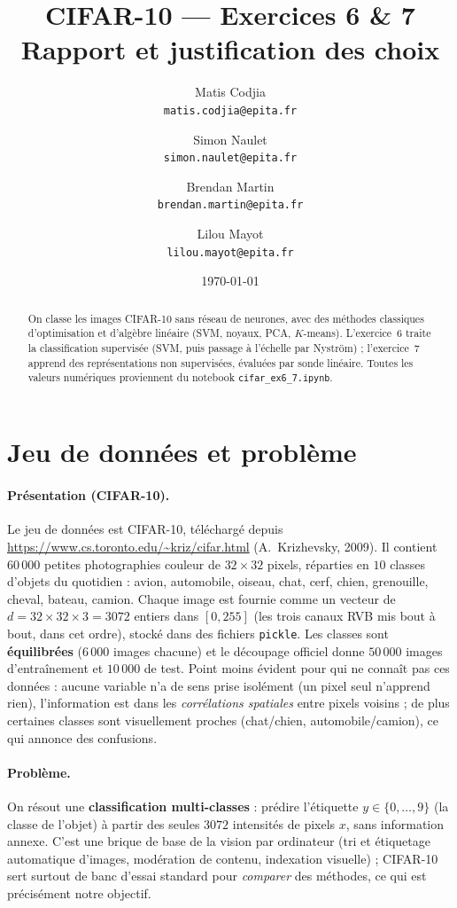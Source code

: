 \documentclass[11pt,a4paper]{article}
\title{\textbf{CIFAR-10 — Exercices 6 \& 7}\\[2pt]
\large Rapport et justification des choix}
\author{Matis Codjia\\ \texttt{matis.codjia@epita.fr}
  \and
   Simon Naulet\\ \texttt{simon.naulet@epita.fr}
  \and
  Brendan Martin\\ \texttt{brendan.martin@epita.fr}
  \and
   Lilou Mayot\\ \texttt{lilou.mayot@epita.fr}}
\date{\today}
\begin{document}
\maketitle
\vspace{-1.2em}

\begin{abstract}
\noindent On classe les images CIFAR-10 sans réseau de neurones, avec des
méthodes classiques d'optimisation et d'algèbre linéaire (SVM, noyaux, PCA,
$K$-means). L'exercice~6 traite la classification supervisée (SVM, puis passage à
l'échelle par Nyström) ; l'exercice~7 apprend des représentations non supervisées,
évaluées par sonde linéaire. Toutes les valeurs numériques proviennent du notebook
\texttt{cifar\_ex6\_7.ipynb}.
\end{abstract}

\section{Jeu de données et problème}
\paragraph{Présentation (CIFAR-10).} Le jeu de données est CIFAR-10, téléchargé
depuis \url{https://www.cs.toronto.edu/~kriz/cifar.html} (A.~Krizhevsky, 2009). Il
contient $60\,000$ petites photographies couleur de $32\times32$ pixels, réparties
en $10$ classes d'objets du quotidien : avion, automobile, oiseau, chat, cerf,
chien, grenouille, cheval, bateau, camion. Chaque image est fournie comme un
vecteur de $d=32\times32\times3=3072$ entiers dans $[0,255]$ (les trois canaux RVB
mis bout à bout, dans cet ordre), stocké dans des fichiers \texttt{pickle}. Les
classes sont \textbf{équilibrées} ($6\,000$ images chacune) et le découpage
officiel donne $50\,000$ images d'entraînement et $10\,000$ de test. Point moins
évident pour qui ne connaît pas ces données : aucune variable n'a de sens prise
isolément (un pixel seul n'apprend rien), l'information est dans les
\emph{corrélations spatiales} entre pixels voisins ; de plus certaines classes sont
visuellement proches (chat/chien, automobile/camion), ce qui annonce des confusions.

\paragraph{Problème.} On résout une \textbf{classification multi-classes} :
prédire l'étiquette $y\in\{0,\dots,9\}$ (la classe de l'objet) à partir des seules
$3072$ intensités de pixels $x$, sans information annexe. C'est une brique de base
de la vision par ordinateur (tri et étiquetage automatique d'images, modération de
contenu, indexation visuelle) ; CIFAR-10 sert surtout de banc d'essai standard pour
\emph{comparer} des méthodes, ce qui est précisément notre objectif.
\end{document}

